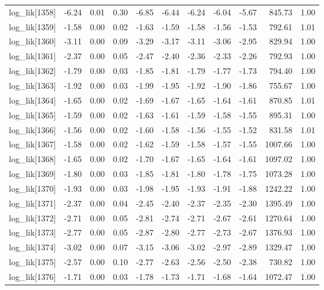 \begin{table}[ht]
\begin{tabular}{rrrrrrrrrrr}
  log\_lik[1358] & -6.24 & 0.01 & 0.30 & -6.85 & -6.44 & -6.24 & -6.04 & -5.67 & 845.73 & 1.00 \\ 
  log\_lik[1359] & -1.58 & 0.00 & 0.02 & -1.63 & -1.59 & -1.58 & -1.56 & -1.53 & 792.61 & 1.01 \\ 
  log\_lik[1360] & -3.11 & 0.00 & 0.09 & -3.29 & -3.17 & -3.11 & -3.06 & -2.95 & 829.94 & 1.00 \\ 
  log\_lik[1361] & -2.37 & 0.00 & 0.05 & -2.47 & -2.40 & -2.36 & -2.33 & -2.26 & 792.93 & 1.00 \\ 
  log\_lik[1362] & -1.79 & 0.00 & 0.03 & -1.85 & -1.81 & -1.79 & -1.77 & -1.73 & 794.40 & 1.00 \\ 
  log\_lik[1363] & -1.92 & 0.00 & 0.03 & -1.99 & -1.95 & -1.92 & -1.90 & -1.86 & 755.67 & 1.00 \\ 
  log\_lik[1364] & -1.65 & 0.00 & 0.02 & -1.69 & -1.67 & -1.65 & -1.64 & -1.61 & 870.85 & 1.01 \\ 
  log\_lik[1365] & -1.59 & 0.00 & 0.02 & -1.63 & -1.61 & -1.59 & -1.58 & -1.55 & 895.31 & 1.00 \\ 
  log\_lik[1366] & -1.56 & 0.00 & 0.02 & -1.60 & -1.58 & -1.56 & -1.55 & -1.52 & 831.58 & 1.01 \\ 
  log\_lik[1367] & -1.58 & 0.00 & 0.02 & -1.62 & -1.59 & -1.58 & -1.57 & -1.55 & 1007.66 & 1.00 \\ 
  log\_lik[1368] & -1.65 & 0.00 & 0.02 & -1.70 & -1.67 & -1.65 & -1.64 & -1.61 & 1097.02 & 1.00 \\ 
  log\_lik[1369] & -1.80 & 0.00 & 0.03 & -1.85 & -1.81 & -1.80 & -1.78 & -1.75 & 1073.28 & 1.00 \\ 
  log\_lik[1370] & -1.93 & 0.00 & 0.03 & -1.98 & -1.95 & -1.93 & -1.91 & -1.88 & 1242.22 & 1.00 \\ 
  log\_lik[1371] & -2.37 & 0.00 & 0.04 & -2.45 & -2.40 & -2.37 & -2.35 & -2.30 & 1395.49 & 1.00 \\ 
  log\_lik[1372] & -2.71 & 0.00 & 0.05 & -2.81 & -2.74 & -2.71 & -2.67 & -2.61 & 1270.64 & 1.00 \\ 
  log\_lik[1373] & -2.77 & 0.00 & 0.05 & -2.87 & -2.80 & -2.77 & -2.73 & -2.67 & 1376.93 & 1.00 \\ 
  log\_lik[1374] & -3.02 & 0.00 & 0.07 & -3.15 & -3.06 & -3.02 & -2.97 & -2.89 & 1329.47 & 1.00 \\ 
  log\_lik[1375] & -2.57 & 0.00 & 0.10 & -2.77 & -2.63 & -2.56 & -2.50 & -2.38 & 730.82 & 1.00 \\ 
  log\_lik[1376] & -1.71 & 0.00 & 0.03 & -1.78 & -1.73 & -1.71 & -1.68 & -1.64 & 1072.47 & 1.00 \\ 

\end{tabular}
\end{table}

